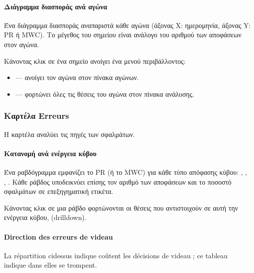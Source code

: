 \documentclass[letterpaper,10pt,greek]{sphinxmanual}
\begin{document}
\paragraph{Διάγραμμα διασποράς ανά αγώνα}
\label{\detokenize{manuel:scatter-plot-par-match}}
\sphinxAtStartPar
Ένα διάγραμμα διασποράς αναπαριστά κάθε αγώνα (άξονας X: ημερομηνία, άξονας Y: PR ή MWC). Το μέγεθος του σημείου είναι ανάλογο του αριθμού των αποφάσεων στον αγώνα.

\sphinxAtStartPar
Κάνοντας κλικ σε ένα σημείο ανοίγει ένα μενού περιβάλλοντος:
\begin{itemize}
\item {} 
\sphinxAtStartPar
{} — ανοίγει τον αγώνα στον πίνακα αγώνων.

\item {} 
\sphinxAtStartPar
{} — φορτώνει όλες τις θέσεις του αγώνα στον πίνακα ανάλυσης.

\end{itemize}


\subsubsection{Καρτέλα Erreurs}
\label{\detokenize{manuel:onglet-erreurs}}
\sphinxAtStartPar
Η καρτέλα  αναλύει τις πηγές των σφαλμάτων.


\paragraph{Κατανομή ανά ενέργεια κύβου}
\label{\detokenize{manuel:repartition-par-action-de-videau}}
\sphinxAtStartPar
Ένα ραβδόγραμμα εμφανίζει το PR (ή το MWC) για κάθε τύπο απόφασης κύβου: , , , . Κάθε ράβδος υποδεικνύει επίσης τον αριθμό των αποφάσεων και το ποσοστό σφαλμάτων σε επεξηγηματική ετικέτα.

\sphinxAtStartPar
Κάνοντας κλικ σε μια ράβδο φορτώνονται οι θέσεις που αντιστοιχούν σε αυτή την ενέργεια κύβου,  (drill\sphinxhyphen{}down).


\paragraph{Direction des erreurs de videau}
\label{\detokenize{manuel:direction-des-erreurs-de-videau}}
\sphinxAtStartPar
La répartition ci\sphinxhyphen{}dessus indique  coûtent les décisions de videau ;
ce tableau indique dans  elles se trompent.
\end{document}
